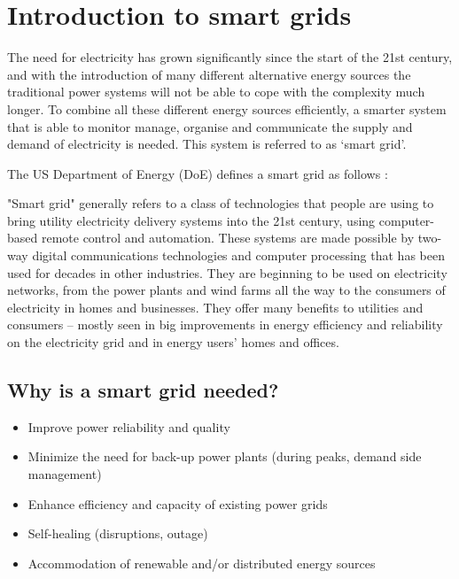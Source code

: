 \section{Introduction to smart grids}
The need for electricity has grown significantly since the start of the 21st century, and with the introduction of many different alternative energy sources the traditional power systems will not be able to cope with the complexity much longer. To combine all these different energy sources efficiently, a smarter system that is able to monitor manage, organise and communicate the supply and demand of electricity is needed. This system is referred to as ‘smart grid’. 

The US Department of Energy (DoE) defines a smart grid as follows \cite{doe}:
\begin{displayquote}
"Smart grid" generally refers to a class of technologies that people are using to bring utility electricity delivery systems into the 21st century, using computer-based remote control and automation. These systems are made possible by two-way digital communications technologies and computer processing that has been used for decades in other industries. They are beginning to be used on electricity networks, from the power plants and wind farms all the way to the consumers of electricity in homes and businesses. They offer many benefits to utilities and consumers -- mostly seen in big improvements in energy efficiency and reliability on the electricity grid and in energy users' homes and offices.
\end{displayquote}

\subsection{Why is a smart grid needed?}
\begin{itemize}
	\item Improve power reliability and quality
	\item Minimize the need for back-up power plants (during peaks, demand side management)
	\item Enhance efficiency and capacity of existing power grids
	\item Self-healing (disruptions, outage)
	\item Accommodation of renewable and/or distributed energy sources
\end{itemize}

